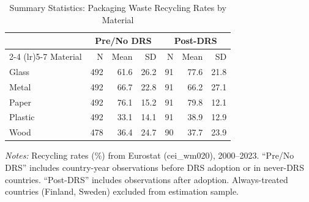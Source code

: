 \begin{table}[H]
\centering
\caption{Summary Statistics: Packaging Waste Recycling Rates by Material}
\label{tab:summary}
\begin{threeparttable}
\begin{tabular}{lrrrrrr}
\toprule
 & \multicolumn{3}{c}{Pre/No DRS} & \multicolumn{3}{c}{Post-DRS} \\
\cmidrule(lr){2-4} \cmidrule(lr){5-7}
Material & N & Mean & SD & N & Mean & SD \\
\midrule
Glass & 492 & 61.6 & 26.2 & 91 & 77.6 & 21.8 \\
Metal & 492 & 66.7 & 22.8 & 91 & 66.2 & 27.1 \\
Paper & 492 & 76.1 & 15.2 & 91 & 79.8 & 12.1 \\
Plastic & 492 & 33.1 & 14.1 & 91 & 38.9 & 12.9 \\
Wood & 478 & 36.4 & 24.7 & 90 & 37.7 & 23.9 \\
\bottomrule
\end{tabular}
\begin{tablenotes}[flushleft]\small
\item \textit{Notes:} Recycling rates (\%) from Eurostat (cei\_wm020), 2000--2023. ``Pre/No DRS'' includes country-year observations before DRS adoption or in never-DRS countries. ``Post-DRS'' includes observations after adoption. Always-treated countries (Finland, Sweden) excluded from estimation sample.
\end{tablenotes}
\end{threeparttable}
\end{table}


